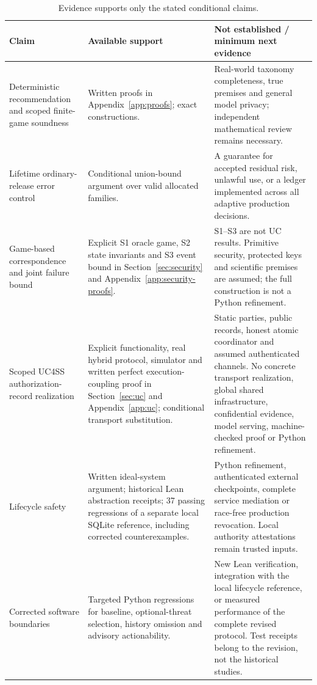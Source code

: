 \begin{table}[t]
\centering\footnotesize
\caption{Evidence supports only the stated conditional claims.}
\label{tab:claim-evidence}
\begin{tabularx}{\textwidth}{@{}p{}XX@{}}
\toprule
Claim & Available support & Not established / minimum next evidence \\
\midrule
Deterministic recommendation and scoped finite-game soundness & Written proofs in Appendix~\ref{app:proofs}; exact constructions. & Real-world taxonomy completeness, true premises and general model privacy; independent mathematical review remains necessary. \\
Lifetime ordinary-release error control & Conditional union-bound argument over valid allocated families. & A guarantee for accepted residual risk, unlawful use, or a ledger implemented across all adaptive production decisions. \\
Game-based correspondence and joint failure bound & Explicit S1 oracle game, S2 state invariants and S3 event bound in Section~\ref{sec:security} and Appendix~\ref{app:security-proofs}. & S1--S3 are not UC results. Primitive security, protected keys and scientific premises are assumed; the full construction is not a Python refinement. \\
Scoped UC4SS authorization-record realization & Explicit functionality, real hybrid protocol, simulator and written perfect execution-coupling proof in Section~\ref{sec:uc} and Appendix~\ref{app:uc}; conditional transport substitution. & Static parties, public records, honest atomic coordinator and assumed authenticated channels. No concrete transport realization, global shared infrastructure, confidential evidence, model serving, machine-checked proof or Python refinement. \\
Lifecycle safety & Written ideal-system argument; historical Lean abstraction receipts; 37 passing regressions of a separate local SQLite reference, including corrected counterexamples. & Python refinement, authenticated external checkpoints, complete service mediation or race-free production revocation. Local authority attestations remain trusted inputs. \\
Corrected software boundaries & Targeted Python regressions for baseline, optional-threat selection, history omission and advisory actionability. & New Lean verification, integration with the local lifecycle reference, or measured performance of the complete revised protocol. Test receipts belong to the revision, not the historical studies. \\

\end{tabularx}
\end{table}
